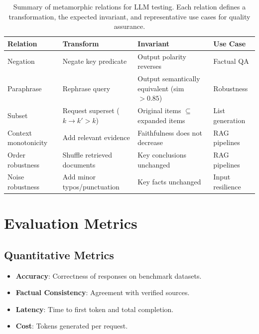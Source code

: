 \begin{table}[t]
\centering
\small
\caption{Summary of metamorphic relations for LLM testing. Each relation defines a transformation, the expected invariant, and representative use cases for quality assurance.}
\label{tab:ch10_metamorphic_relations}
\setlength{\tabcolsep}{5pt}
\renewcommand{\arraystretch}{1.3}
\begin{tabularx}{\linewidth}{@{}>{\raggedright\arraybackslash}p{22mm}>{\raggedright\arraybackslash}X>{\raggedright\arraybackslash}X>{\raggedright\arraybackslash}p{22mm}@{}}
\toprule
\rowcolor{gray!15}
\textbf{Relation} & \textbf{Transform} & \textbf{Invariant} & \textbf{Use Case} \\
\midrule
Negation & Negate key predicate & Output polarity reverses & Factual QA \\
Paraphrase & Rephrase query & Output semantically equivalent (sim $> 0.85$) & Robustness \\
Subset & Request superset ($k \to k'>k$) & Original items $\subseteq$ expanded items & List generation \\
Context monotonicity & Add relevant evidence & Faithfulness does not decrease & RAG pipelines \\
Order robustness & Shuffle retrieved documents & Key conclusions unchanged & RAG pipelines \\
Noise robustness & Add minor typos/punctuation & Key facts unchanged & Input resilience \\
\bottomrule
\end{tabularx}
\end{table}

\section{Evaluation Metrics}
\label{sec:ch10-evaluation-metrics}

\subsection{Quantitative Metrics}
\begin{itemize}
    \item \textbf{Accuracy}: Correctness of responses on benchmark datasets.
    \item \textbf{Factual Consistency}: Agreement with verified sources.
    \item \textbf{Latency}: Time to first token and total completion.
    \item \textbf{Cost}: Tokens generated per request.
\end{itemize}

